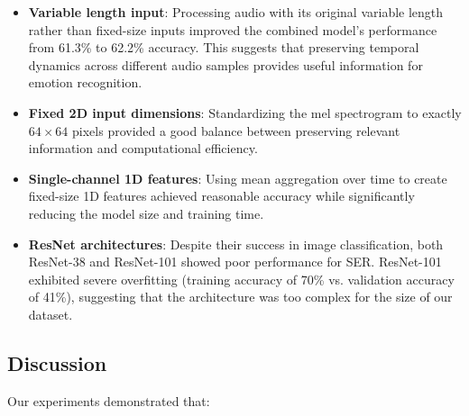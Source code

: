 \begin{itemize}
    \item \textbf{Variable length input}: Processing audio with its original variable length rather than fixed-size inputs improved the combined model's performance from 61.3\% to 62.2\% accuracy. This suggests that preserving temporal dynamics across different audio samples provides useful information for emotion recognition.
    
    \item \textbf{Fixed 2D input dimensions}: Standardizing the mel spectrogram to exactly $64 \times 64$ pixels provided a good balance between preserving relevant information and computational efficiency.
    
    \item \textbf{Single-channel 1D features}: Using mean aggregation over time to create fixed-size 1D features achieved reasonable accuracy while significantly reducing the model size and training time.
    
    \item \textbf{ResNet architectures}: Despite their success in image classification, both ResNet-38 and ResNet-101 showed poor performance for SER. ResNet-101 exhibited severe overfitting (training accuracy of 70\% vs. validation accuracy of 41\%), suggesting that the architecture was too complex for the size of our dataset.
\end{itemize}

\subsection{Discussion}

Our experiments demonstrated that:

